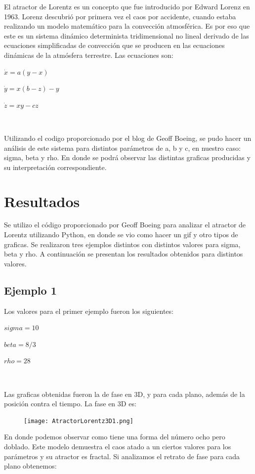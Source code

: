 \documentclass[12pt]{article}
\begin{document}
El atractor de Lorentz es un concepto que fue introducido por Edward Lorenz en 1963. Lorenz descubrió por primera vez el caos por accidente, cuando estaba realizando un modelo matemático para la convección atmosférica. Es por eso que este es un sistema dinámico determinista tridimensional no lineal derivado de las ecuaciones simplificadas de  convección que se producen en las ecuaciones dinámicas de la atmósfera terrestre. Las ecuaciones son: \\

\centerline{$ \dot x = a(y-x)$}
\centerline{$ \dot y = x(b-z) - y$}
\centerline{$ \dot z = xy - cz$}
$    $

Utilizando el codigo proporcionado por el blog de Geoff Boeing, se pudo hacer un análisis de este sistema para distintos parámetros de a, b y c, en nuestro caso: sigma, beta y rho. En donde se podrá observar las distintas graficas producidas y su interpretación correspondiente.

\section{Resultados}
Se utilizo el código proporcionado por Geoff Boeing para analizar el atractor de Lorentz utilizando Python, en donde se vio como hacer un gif y otro tipos de graficas. Se realizaron tres ejemplos distintos con distintos valores para sigma, beta y rho. A continuación se presentan los resultados obtenidos para distintos valores. \\

\subsection{Ejemplo 1}
Los valores para el primer ejemplo fueron los siguientes: \\

\centerline{$ sigma = 10$}
\centerline{$ beta = 8/3$}
\centerline{$ rho = 28$}
$    $

Las graficas obtenidas fueron la de fase en 3D, y para cada plano, además de la posición contra el tiempo. La fase en 3D es:

\pagebreak

\begin{figure}[h!]
    \centering
\texttt{[image: AtractorLorentz3D1.png]}
\end{figure}

En donde podemos observar como tiene una forma del número ocho pero doblado. Este modelo demuestra el caos atado a un ciertos valores para los parámetros y su atractor es fractal. Si analizamos el retrato de fase para cada plano obtenemos:
\end{document}
